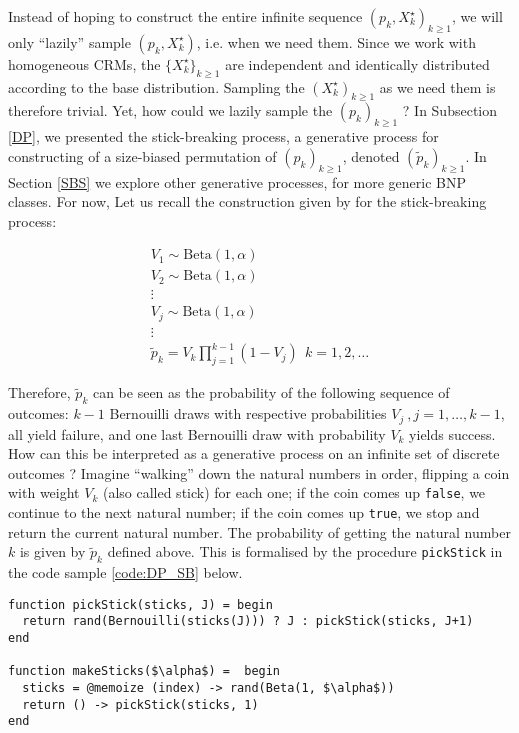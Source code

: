 Instead of hoping to construct the entire infinite sequence $\left({p}_k, X^\star_k \right)_{k \ge 1}$, we will only ``lazily'' sample $\left({p}_k, X^\star_k \right)$, i.e. when we need them.
Since we work with homogeneous \glspl{CRM}, the $\{X^\star_k\}_{k \ge 1}$ are independent and identically distributed according to the base distribution. Sampling the $(X^\star_k)_{k \ge 1}$ as we need them is therefore trivial. Yet, how could we lazily sample the $({p}_k)_{k \ge 1}$ ?
In Subsection \ref{DP}, we presented the stick-breaking process, a generative process for constructing of a size-biased permutation of $({p}_k)_{k \ge 1}$, denoted $(\tilde{p}_k)_{k \ge 1}$.
In Section \ref{SBS} we explore other generative processes, for more generic \gls{BNP} classes. For now, Let us recall the construction given by \cite{sethuraman94} for the stick-breaking process:


\begin{gather*}
V_1 \sim \text{Beta}(1, \alpha) \\
V_2 \sim \text{Beta}(1, \alpha) \\
\vdots \\
V_j \sim \text{Beta}(1, \alpha) \\
\vdots \\
\tilde{p}_k = V_k \prod_{j=1}^{k-1}(1-V_j) \ \ k= 1,2,\dots
\end{gather*}

Therefore, $\tilde{p}_k$ can be seen as the probability of the following sequence of outcomes: $k-1$ Bernouilli draws with respective probabilities $V_j \ , j=1,\dots,k-1$, all yield failure, and one last Bernouilli draw with probability $V_k$ yields success.
How can this be interpreted as a generative process on an infinite set of discrete outcomes ?
Imagine ``walking'' down the natural numbers in order, flipping a coin with weight $V_k$ (also called stick) for each one; if the coin comes up \texttt{false}, we continue to the next natural number; if the coin comes up \texttt{true}, we stop and return the current natural number. The probability of getting the natural number $k$ is given by $\tilde{p}_k$ defined above. This is formalised by the procedure \texttt{pickStick} in the code sample \ref{code:DP_SB} below.

\begin{lstlisting}[caption={\acrlong{DP} stick-breaking representation written in Julia.},captionpos=b,label=code:DP_SB]
function pickStick(sticks, J) = begin
  return rand(Bernouilli(sticks(J))) ? J : pickStick(sticks, J+1)
end

function makeSticks($\alpha$) =  begin
  sticks = @memoize (index) -> rand(Beta(1, $\alpha$))
  return () -> pickStick(sticks, 1)
end
\end{lstlisting}

